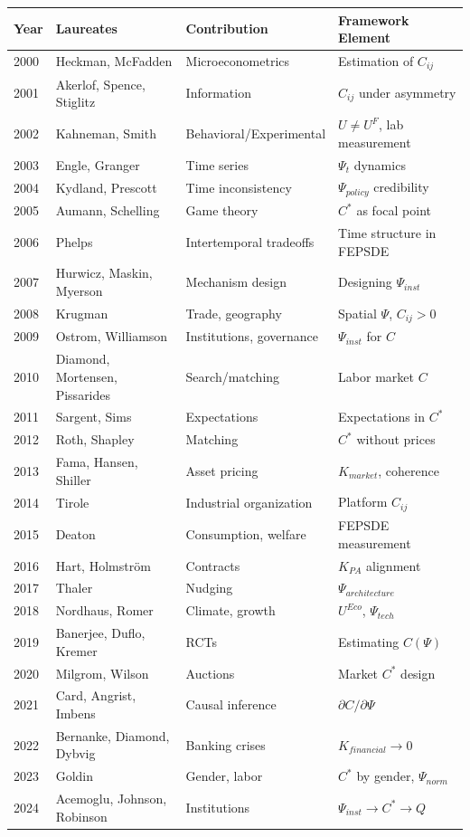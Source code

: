 \documentclass[12pt,a4paper]{article}
\begin{document}
\begin{center}
\renewcommand{\arraystretch}{1.15}
\small
\begin{tabular}{llll}
\hline
\textbf{Year} & \textbf{Laureates} & \textbf{Contribution} & \textbf{Framework Element} \\
\hline
2000 & Heckman, McFadden & Microeconometrics & Estimation of $C_{ij}$ \\
2001 & Akerlof, Spence, Stiglitz & Information & $C_{ij}$ under asymmetry \\
2002 & Kahneman, Smith & Behavioral/Experimental & $U \neq U^F$, lab measurement \\
2003 & Engle, Granger & Time series & $\Psi_t$ dynamics \\
2004 & Kydland, Prescott & Time inconsistency & $\Psi_{policy}$ credibility \\
2005 & Aumann, Schelling & Game theory & $C^*$ as focal point \\
2006 & Phelps & Intertemporal tradeoffs & Time structure in FEPSDE \\
2007 & Hurwicz, Maskin, Myerson & Mechanism design & Designing $\Psi_{inst}$ \\
2008 & Krugman & Trade, geography & Spatial $\Psi$, $C_{ij} > 0$ \\
2009 & Ostrom, Williamson & Institutions, governance & $\Psi_{inst}$ for $C$ \\
2010 & Diamond, Mortensen, Pissarides & Search/matching & Labor market $C$ \\
2011 & Sargent, Sims & Expectations & Expectations in $C^*$ \\
2012 & Roth, Shapley & Matching & $C^*$ without prices \\
2013 & Fama, Hansen, Shiller & Asset pricing & $K_{market}$, coherence \\
2014 & Tirole & Industrial organization & Platform $C_{ij}$ \\
2015 & Deaton & Consumption, welfare & FEPSDE measurement \\
2016 & Hart, Holmström & Contracts & $K_{PA}$ alignment \\
2017 & Thaler & Nudging & $\Psi_{architecture}$ \\
2018 & Nordhaus, Romer & Climate, growth & $U^{Eco}$, $\Psi_{tech}$ \\
2019 & Banerjee, Duflo, Kremer & RCTs & Estimating $C(\Psi)$ \\
2020 & Milgrom, Wilson & Auctions & Market $C^*$ design \\
2021 & Card, Angrist, Imbens & Causal inference & $\partial C / \partial \Psi$ \\
2022 & Bernanke, Diamond, Dybvig & Banking crises & $K_{financial} \to 0$ \\
2023 & Goldin & Gender, labor & $C^*$ by gender, $\Psi_{norm}$ \\
2024 & Acemoglu, Johnson, Robinson & Institutions & $\Psi_{inst} \to C^* \to Q$ \\
\hline
\end{tabular}
\end{center}
\end{document}
